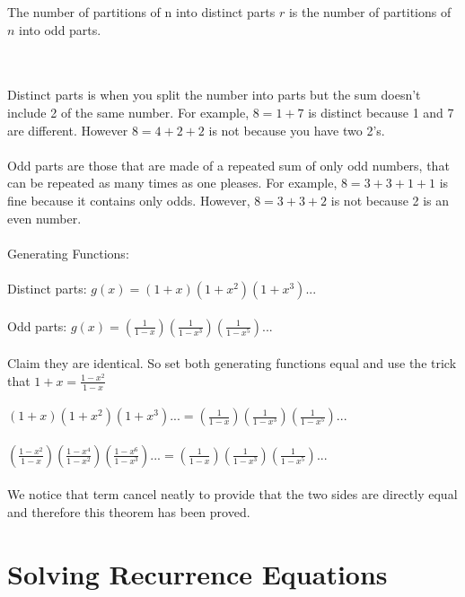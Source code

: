 \documentclass[11pt,twosided]{article}
\begin{document}
\begin{theorem}The number of partitions of n into distinct parts $r$ is the number of partitions of $n$ into odd parts.\end{theorem}
\\\\
Distinct parts is when you split the number into parts but the sum doesn't include 2 of the same number. For example, $8 = 1 + 7$ is distinct because 1 and 7 are different. However $8 = 4 + 2 + 2$ is not because you have two 2's. \\\\
Odd parts are those that are made of a repeated sum of only odd numbers, that can be repeated as many times as one pleases. For example, $8 = 3 + 3 + 1 + 1$ is fine because it contains only odds. However, $8 = 3 + 3 + 2$ is not because 2 is an even number.\\\\
Generating Functions:\\\\
Distinct parts: $g(x) = (1+x)(1+x^2)(1+x^3)...$\\\\
Odd parts: $g(x) = (\frac{1}{1-x})(\frac{1}{1-x^3})(\frac{1}{1-x^5})...$\\\\
Claim they are identical. So set both generating functions equal and use the trick that $1+x = \frac{1-x^2}{1-x}$ \\\\
$(1+x)(1+x^2)(1+x^3)... = (\frac{1}{1-x})(\frac{1}{1-x^3})(\frac{1}{1-x^5})...$\\\\
$(\frac{1-x^2}{1-x})(\frac{1-x^4}{1-x^2})(\frac{1-x^6}{1-x^3})... = (\frac{1}{1-x})(\frac{1}{1-x^3})(\frac{1}{1-x^5})...$\\\\
We notice that term cancel neatly to provide that the two sides are directly equal and therefore this theorem has been proved.

\section{Solving Recurrence Equations}
\end{document}
